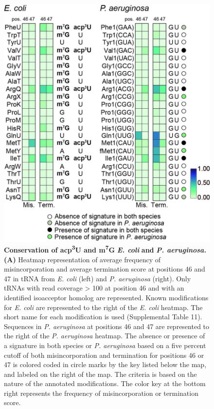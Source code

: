 \documentclass[times, twoside]{zHenriquesLab-StyleBioRxiv}
\begin{document}
\begin{figure}
    \centering
    \includegraphics[width=1\linewidth]{Figure4_PB.jpg}
    \caption{\textbf{Conservation of acp}\textbf{\textsuperscript{3}}\textbf{U and m}\textbf{\textsuperscript{7}}\textbf{G }\textit{\textbf{E. coli}}\textbf{ and }\textit{\textbf{P. aeruginosa.}} \textbf{(A) }Heatmap representation of average frequency of misincorporation and average termination score at positions 46 and 47 in tRNA from \textit{E. coli} (left) and \textit{P. aeruginosa} (right). Only tRNAs with read coverage > 100 at position 46 and with an identified isoacceptor homolog are represented. Known modifications for \textit{E. coli} are represented to the right of the \textit{E. coli} heatmap. The short name for each modification is used (Supplemental Table 11). Sequences in \textit{P. aeruginosa} at positions 46 and 47 are represented to the right of the \textit{P. aeruginosa} heatmap. The absence or presence of a signature in both species or \textit{P. aeruginosa} based on a five percent cutoff of both misincorporation and termination for positions 46 or 47 is colored coded in circle marks by the key listed below the map, and labeled on the right of the map. The criteria is based on the nature of the annotated modifications. The color key at the bottom right represents the frequency of misincorporation or termination score.}
    \label{fig:enter-label}
\end{figure}
\end{document}
